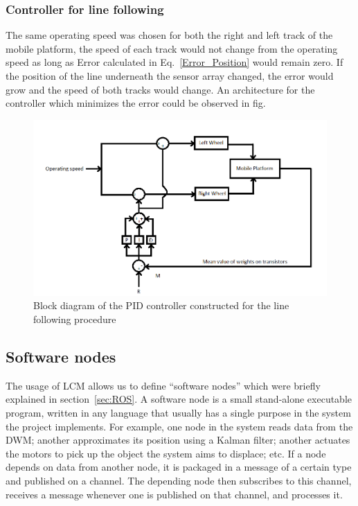 \subsubsection{Controller for line following}
The same operating speed was chosen for both the right and left track of the mobile platform, the speed of each track would not change from the operating speed as long as Error calculated in Eq.~\eqref{Error_Position} would remain zero. If the position of the line underneath the sensor array changed, the error would grow and the speed of both tracks would change. An architecture for the controller which minimizes the error could be observed in fig.

\begin{figure}[h]
    \centering
    \includegraphics[width=\textwidth]{sections/assets/Control_system1.PNG}
    \caption{Block diagram of the PID controller constructed for the line following procedure}
    \label{Control_system1}
\end{figure}

\subsection{Software nodes}
The usage of LCM allows us to define ``software nodes'' which were briefly explained in section~\ref{sec:ROS}.
A software node is a small stand-alone executable program, written in any language that usually has a single purpose in the system the project implements.
For example, one node in the system reads data from the DWM;
another approximates its position using a Kalman filter;
another actuates the motors to pick up the object the system aims to displace; etc.
If a node depends on data from another node,
it is packaged in a message of a certain type and published on a channel.
The depending node then subscribes to this channel,
receives a message whenever one is published on that channel,
and processes it.

